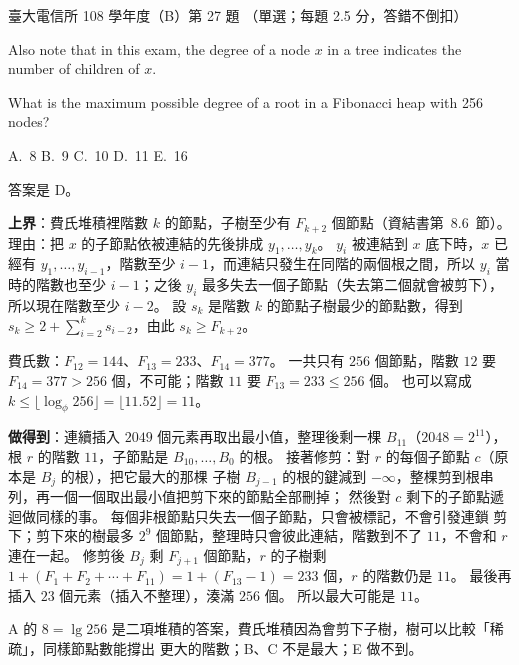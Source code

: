 \begin{pastexam}[label={px:ntu-108-comm-dsab-27}]{臺大電信所 108 學年度（B）第 27 題}
（單選；每題 2.5 分，答錯不倒扣）

Also note that in this exam, the degree of a node $x$ in a tree indicates the number of children
of $x$.

What is the maximum possible degree of a root in a Fibonacci heap with 256 nodes?

A.~8 \qquad B.~9 \qquad C.~10 \qquad D.~11 \qquad E.~16
\end{pastexam}

\begin{pastsoln}
答案是 D。

\textbf{上界}：費氏堆積裡階數 $k$ 的節點，子樹至少有 $F_{k+2}$ 個節點（資結書第~8.6~節）。 理由：把
$x$ 的子節點依被連結的先後排成 $y_1, \ldots, y_k$。 $y_i$ 被連結到 $x$ 底下時，$x$ 已經有 $y_1,
\ldots, y_{i-1}$，階數至少 $i - 1$，而連結只發生在同階的兩個根之間，所以 $y_i$ 當時的階數也至少
$i - 1$；之後 $y_i$ 最多失去一個子節點（失去第二個就會被剪下），所以現在階數至少 $i - 2$。 設 $s_k$
是階數 $k$ 的節點子樹最少的節點數，得到 $s_k \ge 2 + \sum_{i=2}^{k} s_{i-2}$，由此 $s_k \ge F_{k+2}$。

費氏數：$F_{12} = 144$、$F_{13} = 233$、$F_{14} = 377$。 一共只有 $256$ 個節點，階數 $12$ 要
$F_{14} = 377 > 256$ 個，不可能；階數 $11$ 要 $F_{13} = 233 \le 256$ 個。 也可以寫成
$k \le \lfloor \log_\phi 256 \rfloor = \lfloor 11.52 \rfloor = 11$。

\textbf{做得到}：連續插入 $2049$ 個元素再取出最小值，整理後剩一棵 $B_{11}$（$2048 = 2^{11}$），根 $r$
的階數 $11$，子節點是 $B_{10}, \ldots, B_0$ 的根。 接著修剪：對 $r$ 的每個子節點 $c$（原本是 $B_j$ 的根），把它最大的那棵
子樹 $B_{j-1}$ 的根的鍵減到 $-\infty$，整棵剪到根串列，再一個一個取出最小值把剪下來的節點全部刪掉；
然後對 $c$ 剩下的子節點遞迴做同樣的事。 每個非根節點只失去一個子節點，只會被標記，不會引發連鎖
剪下；剪下來的樹最多 $2^9$ 個節點，整理時只會彼此連結，階數到不了 $11$，不會和 $r$ 連在一起。 修剪後 $B_j$ 剩 $F_{j+1}$ 個節點，$r$ 的子樹剩
$1 + (F_1 + F_2 + \cdots + F_{11}) = 1 + (F_{13} - 1) = 233$ 個，$r$ 的階數仍是 $11$。 最後再插入
$23$ 個元素（插入不整理），湊滿 $256$ 個。 所以最大可能是 $11$。

A 的 $8 = \lg 256$ 是二項堆積的答案，費氏堆積因為會剪下子樹，樹可以比較「稀疏」，同樣節點數能撐出
更大的階數；B、C 不是最大；E 做不到。
\end{pastsoln}
